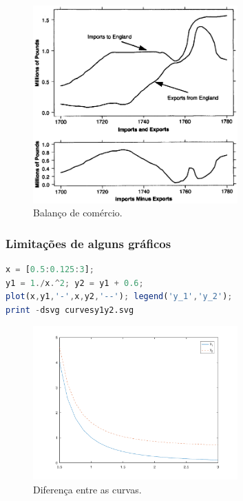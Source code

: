 \begin{frame}[allowframebreaks]
\framebreak

\begin{figure}[h]
 \centering
  \includegraphics[width=0.7\textwidth,height=0.9\textheight,keepaspectratio]{figures/imports-exports2.png}
 \caption{Balanço de comércio.}
 \label{fig-importex2}
\end{figure}

\end{frame}




\begin{frame}
\frametitle{Limitações de alguns gráficos}

\begin{lstlisting}[language=Octave, label=lst-y1y2, caption={Onde as curvas $y_1$ e $y_2$ estão mais próximas e mais distantes?}, postbreak=\mbox{$\hookrightarrow$\space}, basicstyle=\fontsize{8}{10}\selectfont\ttfamily]
x = [0.5:0.125:3];
y1 = 1./x.^2; y2 = y1 + 0.6;
plot(x,y1,'-',x,y2,'--'); legend('y_1','y_2');
print -dsvg curvesy1y2.svg
\end{lstlisting}

\begin{figure}[h]
 \centering
  \includegraphics[width=0.7\textwidth,height=0.9\textheight,keepaspectratio]{figures/curvesy1y2.pdf}
 \caption{Diferença entre as curvas.}
 \label{fig-curvesy1y2}
\end{figure}

\end{frame}


